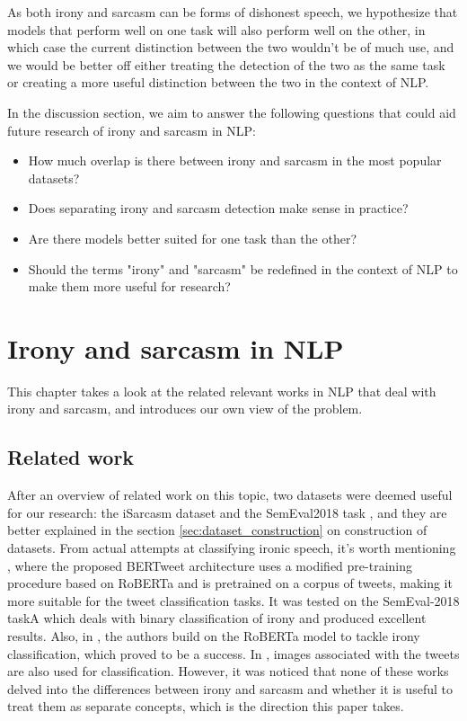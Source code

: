 \documentclass[10pt, a4paper]{article}
\begin{document}
As both irony and sarcasm 
can be forms of dishonest speech, 
we hypothesize that models that perform well on one task will also perform
well on the other, in which case the current distinction between the two wouldn't be of much use, and we would be better off
either treating the detection of the two as the same task or creating a more useful distinction between the two in the context
of NLP.

In the discussion section, we aim to answer the following questions that could aid future research of irony
and sarcasm in NLP:

\begin{itemize}
   \item How much overlap is there between irony and sarcasm in the most popular datasets?
   \item Does separating irony and sarcasm detection make sense in practice?
   \item Are there models better suited for one task than the other?
   \item Should the terms "irony" and "sarcasm" be redefined in the context of NLP to make them more useful for research?
\end{itemize}

\section{Irony and sarcasm in NLP}
This chapter takes a look at the related relevant works in NLP that deal with irony and sarcasm, and introduces our own view 
of the problem.
\subsection{Related work}
After an overview of related work on this topic, two datasets were deemed useful for our research: the iSarcasm dataset \citep{iSarcasm} and 
the SemEval2018 task \citep{semeval-2018}, and they are better explained in the section \ref{sec:dataset_construction} on construction of 
datasets. From actual attempts at classifying 
ironic speech, it's worth mentioning \citep{bertweet}, where the proposed BERTweet architecture uses a modified pre-training procedure based 
on RoBERTa \citep{roberta} and is pretrained on a corpus of tweets, 
making it more suitable for the tweet classification tasks. It was tested on the SemEval-2018 taskA which 
deals with binary classification of irony and produced excellent results. Also, in \citep{transformers4irony-2020}, the authors build on the 
RoBERTa model to tackle 
irony classification, which proved to be a success. In \citep{transformers4irony-2023}, images associated with the tweets are also used 
for classification. However, it was noticed that none of these works delved into the differences between irony and sarcasm and whether it 
is useful to treat them as separate concepts, which is the direction this paper takes.
 
\end{document}
